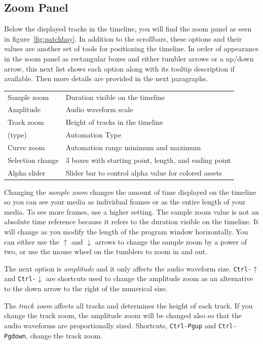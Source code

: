 \subsection{Zoom Panel}%
\label{sub:zoom_panel}

Below the displayed tracks in the timeline, you will find the zoom panel as seen in figure~\ref{fig:patchbay}.
In addition to the scrollbars, these options and their values are another set of tools for positioning the timeline.  
In order of appearance in the zoom panel as rectangular boxes and either tumbler arrows or a up/down arrow, this next list shows each option along with its tooltip description if available.
Then more details are provided in the next paragraphs.

\vspace{2ex}
\begin{tabular}{ l  l }
   \hline
	Sample zoom & Duration visible on the timeline \\
	Amplitude & Audio waveform scale \\
	Track zoom & Height of tracks in the timeline \\
	  (type) & Automation Type \\
	Curve zoom & Automation range minimum and maximum \\
	Selection change & 3 boxes with starting point, length, and ending point \\
	Alpha slider & Slider bar to control alpha value for colored assets \\
   \hline
\end{tabular}

Changing the \emph{sample zoom} changes the amount of time displayed on the timeline 
so you can see your media as individual frames or as the entire length of your media. 
To see more frames, use a higher setting. 
The sample zoom value is not an absolute time reference because it refers to the duration visible on the timeline. It will change as you modify the length of the program window horizontally.
You can either use the $\uparrow$ and $\downarrow$ arrows to change the sample zoom by a power of two, or use the mouse wheel on the tumblers to zoom in and out.


The next option is \emph{amplitude} and it only affects the audio waveform size. \texttt{Ctrl-$\uparrow$} and \texttt{Ctrl-$\downarrow$} are shortcuts used to change the amplitude zoom as an alternative to the down arrow to the right of the numerical size.

The \emph{track zoom} affects all tracks and determines the height of each track. 
If you change the track zoom, the amplitude zoom will be changed also so that the audio waveforms
are proportionally sized.
Shortcuts, \texttt{Ctrl-Pgup} and \texttt{Ctrl-Pgdown}, change the track zoom.

